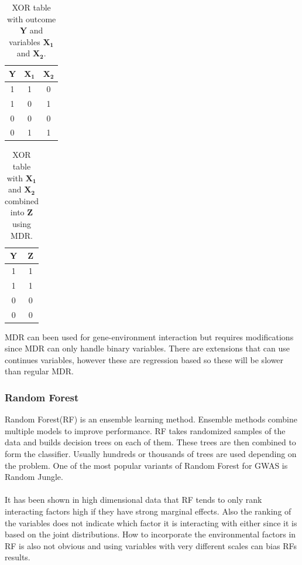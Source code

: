 \documentclass[10pt,a4paper]{report}
\begin{document}
\begin{table}[h]
\begin{tabular}{ | c | c | c | }
  \hline
  \textbf{Y} & $\mathbf{X_1}$ & $\mathbf{X_2}$ \\
  \hline
  1 & 1 & 0 \\
  \hline 
  1 & 0 & 1 \\
  \hline
  0 & 0 & 0 \\
  \hline
  0 & 1 & 1 \\
  \hline
\end{tabular}
\caption{XOR table with outcome $\mathbf{Y}$ and variables $\mathbf{X_1}$ and $\mathbf{X_2}$.}
\label{table:xor_table}
\end{table}
\begin{table}[h]
\begin{tabular}{ | c | c | }
  \hline
  \textbf{Y} & \textbf{Z} \\
  \hline
  1 & 1 \\
  \hline
  1 & 1 \\
  \hline
  0 & 0 \\
  \hline
  0 & 0 \\
  \hline
\end{tabular}
\caption{XOR table with $\mathbf{X_1}$ and $\mathbf{X_2}$ combined into $\mathbf{Z}$ using MDR.}
\label{table:xor_mdr_table}
\end{table}

MDR can been used for gene-environment interaction but requires modifications since MDR can only handle binary variables. There are extensions that can use continues variables, however these are regression based so these will be slower than regular MDR.\cite{gene_enviroment_2013}

\subsubsection{Random Forest}
Random Forest(RF) is an ensemble learning method. Ensemble methods combine multiple models to improve performance. RF takes randomized samples of the data and builds decision trees on each of them. These trees are then combined to form the classifier. Usually hundreds or thousands of trees are used depending on the problem\cite{random_forest}. One of the most popular variants of Random Forest for GWAS is Random Jungle\cite{random_jungle}.\\
\\
It has been shown in high dimensional data that RF tends to only rank interacting factors high if they have strong marginal effects\cite{winham_rf_2012}. Also the ranking of the variables does not indicate which factor it is interacting with either since it is based on the joint distributions\cite{gene_enviroment_2013}. How to incorporate the environmental factors in RF is also not obvious and using variables with very different scales can bias RFs results\cite{gene_enviroment_2013}.
\end{document}
